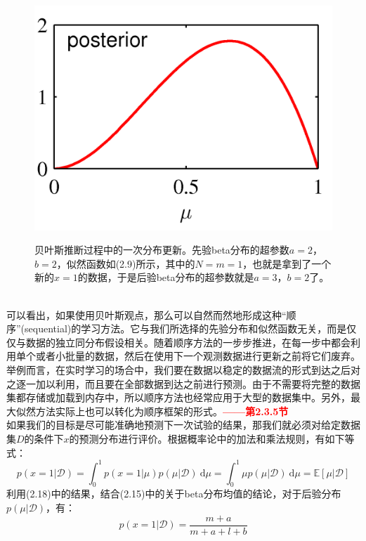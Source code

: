 \documentclass[b5paper]{book}
\numberwithin{equation}{chapter}
\begin{document}
{\begin{figure}[ht]
\begin{minipage}[t]{0.3\linewidth}
		\includegraphics[scale=0.8]{Images/2-3c.png}
		\label{fig:2-3c}
		\end{minipage}
		\caption{贝叶斯推断过程中的一次分布更新。先验beta分布的超参数$a=2$，$b=2$，似然函数如(2.9)所示，其中的$N=m=1$，也就是拿到了一个新的$x=1$的数据，于是后验beta分布的超参数就是$a=3$，$b=2$了。}
	\end{figure}
	\\
	\indent 可以看出，如果使用贝叶斯观点，那么可以自然而然地形成这种“顺序”(sequential)的学习方法。它与我们所选择的先验分布和似然函数无关，而是仅仅与数据的独立同分布假设相关。随着顺序方法的一步步推进，在每一步中都会利用单个或者小批量的数据，然后在使用下一个观测数据进行更新之前将它们废弃。举例而言，在实时学习的场合中，我们要在数据以稳定的数据流的形式到达之后对之逐一加以利用，而且要在全部数据到达之前进行预测。由于不需要将完整的数据集都存储或加载到内存中，所以顺序方法也经常应用于大型的数据集中。另外，最大似然方法实际上也可以转化为顺序框架的形式。\textcolor{red}{\textbf{——第2.3.5节}}\\
	\indent 如果我们的目标是尽可能准确地预测下一次试验的结果，那我们就必须对给定数据集$D$的条件下$x$的预测分布进行评价。根据概率论中的加法和乘法规则，有如下等式：
	\begin{equation}
		p(x=1|\mathcal{D})=\int_0^1p(x=1|\mu)p(\mu|\mathcal{D})\ \mathrm{d}\mu = \int_0^1 \mu p(\mu|\mathcal{D})\ \mathrm{d}\mu = \mathbb{E}[\mu|\mathcal{D}]
	\end{equation}
	利用(2.18)中的结果，结合(2.15)中的关于beta分布均值的结论，对于后验分布$p(\mu|\mathcal{D})$，有：
	\begin{equation}
		p(x=1|\mathcal{D})=\frac{m+a}{m+a+l+b}

\end{equation}}
\end{document}
